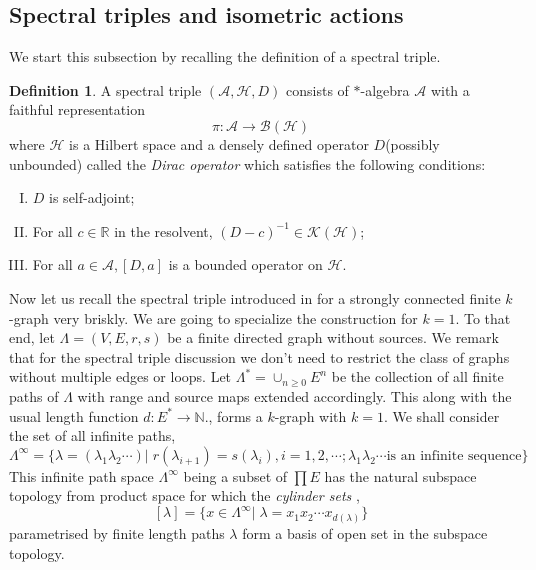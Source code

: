 \documentclass{amsart}
\theoremstyle{plain}
\theoremstyle{definition}
\newtheorem{definition}[subsection]{Definition}
\theoremstyle{remark}
\numberwithin{equation}{section}
\newcommand{\cal}{\mathcal}
\newcommand{\clh}{{\cal H}}
\newcommand{\raro}{\rightarrow}
\begin{document}
\subsection{Spectral triples and isometric actions} We start this subsection by recalling the definition of a spectral triple.
\begin{definition}
    A spectral triple $(\mathcal{A},\mathcal{H},D)$ consists of ${\ast}$-algebra $\mathcal{A}$ with a faithful representation
\begin{equation*}
    \pi: \mathcal{A}\raro \mathcal{B}(\mathcal{H})
\end{equation*}
where $\clh$ is a Hilbert space and a densely defined operator $D$(possibly unbounded) called the \textit{Dirac operator} which satisfies the following conditions:
\begin{enumerate}[(I)]
\setlength\itemsep{0.5em}
    \item $D$ is self-adjoint;
    \item For all $c\in \mathbb{R}$ in the resolvent, $(D-c)^{-1}\in \mathcal{K}(\mathcal{H})$;
\item For all $a\in \mathcal{A}, [D,a]$ is a bounded operator on $\mathcal{H}$.
\end{enumerate}
\end{definition}

Now let us recall the spectral triple introduced in \cite{farsi} for a strongly connected finite $k$-graph very briskly. We are going to specialize the construction for $k=1$. To that end, let $\Lambda=(V,E,r,s)$ be a finite directed graph without sources. We remark that for the spectral triple discussion we don't need to restrict the class of graphs without multiple edges or loops. Let $\Lambda^{\ast}=\cup_{n\geq 0} E^{n}$ be the collection of all finite paths of $\Lambda$ with range and source maps extended accordingly. This along with the usual length function $d:E^{\ast}\raro \mathbb{N}$., forms a $k$-graph with $k=1$. We shall consider the set of all infinite paths,
\begin{displaymath}\Lambda^{\infty}=\{\lambda=(\lambda_{1}\lambda_{2}\cdots)|\; r(\lambda_{i+1})=s(\lambda_{i}), i=1,2,\cdots; \lambda_{1}\lambda_{2}\cdots \text{is an infinite sequence}\}\end{displaymath}
This infinite path space $\Lambda^{\infty}$ being a subset of $\prod E$ has the natural subspace topology from product space for which the \textit{cylinder sets} ,
$$[\lambda]=\{x\in \Lambda^{\infty}|\; \lambda=x_{1}x_{2}\cdots x_{d(\lambda)} \}$$
parametrised by finite length paths $\lambda$ form a basis of open set in the subspace topology. 
\end{document}
